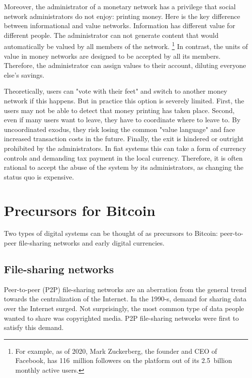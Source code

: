 Moreover, the administrator of a monetary network has a privilege that social network administrators do not enjoy: printing money.
Here is the key difference between informational and value networks.
Information has different value for different people.
The administrator can not generate content that would automatically be valued by all members of the network.
\footnote{For example, as of 2020, Mark Zuckerberg, the founder and CEO of Facebook, has 116~million followers on the platform out of its 2.5~billion monthly active users.}
In contrast, the units of value in money networks are designed to be accepted by all its members.
Therefore, the administrator can assign values to their account, diluting everyone else's savings.

Theoretically, users can "vote with their feet" and switch to another money network if this happens.
But in practice this option is severely limited.
First, the users may not be able to detect that money printing has taken place.
Second, even if many users want to leave, they have to coordinate where to leave to.
By uncoordinated exodus, they risk losing the common "value language" and face increased transaction costs in the future.
Finally, the exit is hindered or outright prohibited by the administrators.
In fiat systems this can take a form of currency controls and demanding tax payment in the local currency.
Therefore, it is often rational to accept the abuse of the system by its administrators, as changing the status quo is expensive.


\section{Precursors for Bitcoin}

Two types of digital systems can be thought of as precursors to Bitcoin: peer-to-peer file-sharing networks and early digital currencies.

\subsection{File-sharing networks}

Peer-to-peer (P2P) file-sharing networks are an aberration from the general trend towards the centralization of the Internet.
In the 1990-s, demand for sharing data over the Internet surged.
Not surprisingly, the most common type of data people wanted to share was copyrighted media.
P2P file-sharing networks were first to satisfy this demand.

